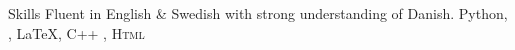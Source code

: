 
\begin{rubric}{Skills}
\entry*[Languages]
	Fluent in English \& Swedish with strong understanding of Danish.
	Python, , \LaTeX, C++ , \textsc{Html}
\entry*[Databases]
\end{rubric}
